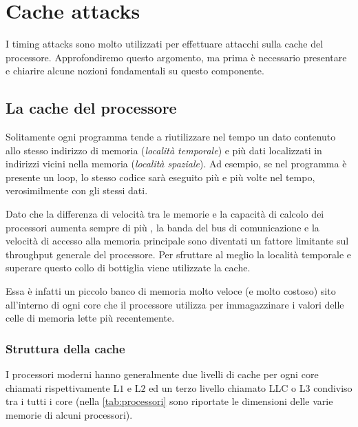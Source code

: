 \chapter{Cache attacks}
	I timing attacks sono molto utilizzati per effettuare attacchi sulla cache del processore. Approfondiremo questo argomento, ma prima è necessario presentare e chiarire alcune nozioni fondamentali su questo componente. 
	
	\section{La cache del processore}
		Solitamente ogni programma tende a riutilizzare nel tempo un dato contenuto allo stesso indirizzo di memoria (\emph{località temporale}) e più dati localizzati in indirizzi vicini nella memoria (\emph{località spaziale}). Ad esempio, se nel programma è presente un loop, lo stesso codice sarà eseguito più e più volte nel tempo, verosimilmente con gli stessi dati.
		
		Dato che la differenza di velocità tra le memorie e la capacità di calcolo dei processori aumenta sempre di più \cite{hennessy2011computer}, la banda del bus di comunicazione e la velocità di accesso alla memoria principale sono diventati un fattore limitante sul throughput generale del processore. Per sfruttare al meglio la località temporale e superare questo collo di bottiglia viene utilizzate la cache. 
		
		Essa è infatti un piccolo banco di memoria molto veloce (e molto costoso) sito all'interno di ogni core che il processore utilizza per immagazzinare i valori delle celle di memoria lette più recentemente. 
		
		\subsection{Struttura della cache}
			I processori moderni hanno generalmente due livelli di cache per ogni core chiamati rispettivamente L$1$ e L$2$ ed un terzo livello chiamato \ac{LLC} o L$3$ condiviso tra i tutti i core (nella \cref{tab:processori} sono riportate le dimensioni delle varie memorie di alcuni processori). 
			
